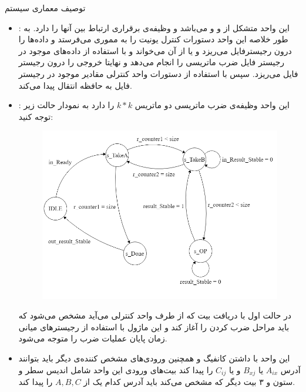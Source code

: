 \documentclass[]{article}
\begin{document}
\begin{section-container}{توصیف معماری سیستم}
\begin{itemize}
	همان طور که از این نمودار حالت مشخص است هرگاه کلمه‌ی  در حافظه نشان‌ دهنده  باشد از حالت اولیه‌ خارج می‌شویم و از  درخواست می‌کنیم که حافظه‌ را در اختیار ما بگذارد، سپس با داشتن کانفیگ می‌توانیم بین ‌‌های مختلف اندیس‌ها را پخش کنیم. این کار به اندازه‌ی $\theta$بار انجام می‌دهیم تا نهایتا همه‌ی $C_{ij}$‌ها توسط پردازنده‌ها محاسبه شده و در مموری ذخیره شود. سپس با درخواست از  دسترسی به حافظه را بدست می‌آوریم و کلمه‌ی  را تغییر می‌دهیم تا  متوجه به پایان رسیدن عملیات شود.
	
	\item 
	:
	این واحد متشکل از  و  و  می‌باشد و وظیفه‌ی برقراری ارتباط بین آنها را دارد. به طور خلاصه این واحد دستورات کنترل یونیت را به مموری می‌فرستد و داده‌ها را درون رجیسترفایل می‌ریزد و یا از آن می‌خواند و  با استفاده از داده‌های موجود در رجیستر فایل ضرب ماتریسی را انجام می‌دهد و نهایتا خروجی را درون رجیستر فایل می‌ریزد. سپس با استفاده از دستورات واحد کنترلی مقادیر موجود در رجیستر فایل به حافظه انتقال پیدا می‌کند.
	\item 
	:
	این واحد وظیفه‌ی ضرب ماتریسی دو ماتریس $k*k$ را دارد به نمودار حالت زیر توجه کنید:
	\begin{figure}[h]
		\centering
		\includegraphics[width=0.5\linewidth]{source/square_matrix.png}
		\caption{}
	\end{figure}
	در حالت اول با دریافت بیت  که از طرف واحد کنترلی می‌آید مشخص می‌شود که باید مراحل ضرب کردن را آغاز کند و این ماژول با استفاده از رجیستر‌های میانی زمان پایان عملیات ضرب را متوجه می‌شود.
	\item 
	این واحد با داشتن کانفیگ و همچنین ورودی‌های مشخص کننده‌ی دیگر باید بتوانند آدرس $A_{ix}$ یا $B_{xj}$ و یا $C_{ij}$ را پیدا کند بیت‌های ورودی این واحد شامل اندیس سطر و ستون و ۳ بیت دیگر که مشخص می‌کند باید آدرس کدام یک از $A,B,C$ را پیدا کند.
\end{itemize}


\end{section-container}
\end{document}

